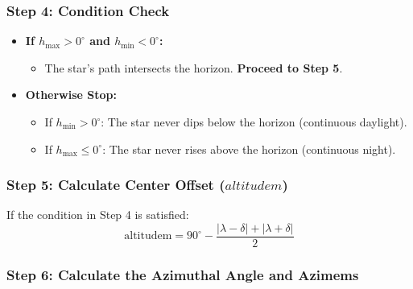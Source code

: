 \documentclass[
  letterpaper,
]{book}
\providecommand{\tightlist}{%
  \setlength{\itemsep}{0pt}\setlength{\parskip}{0pt}}
\begin{document}
\subsubsection{\texorpdfstring{\textbf{Step 4: Condition
Check}}{Step 4: Condition Check}}\label{step-4-condition-check}

\begin{itemize}
\tightlist
\item
  \textbf{If \(h_\text{max} > 0^\circ\) and \(h_\text{min} < 0^\circ\):}

  \begin{itemize}
  \tightlist
  \item
    The star's path intersects the horizon. \textbf{Proceed to Step 5}.
  \end{itemize}
\item
  \textbf{Otherwise Stop:}

  \begin{itemize}
  \tightlist
  \item
    If \(h_\text{min} > 0^\circ\): The star never dips below the horizon
    (continuous daylight).
  \item
    If \(h_\text{max} \leq 0^\circ\): The star never rises above the
    horizon (continuous night).
  \end{itemize}
\end{itemize}

\subsubsection{\texorpdfstring{\textbf{Step 5: Calculate Center Offset
(\(altitudem\))}}{Step 5: Calculate Center Offset (altitudem)}}\label{step-5-calculate-center-offset-altitudem}

If the condition in Step 4 is satisfied: \[
\text{altitudem} = 90^\circ - \frac{|\lambda - \delta| + |\lambda + \delta|}{2}
\]

\subsubsection{\texorpdfstring{\textbf{Step 6: Calculate the Azimuthal
Angle and
Azimems}}{Step 6: Calculate the Azimuthal Angle and Azimems}}\label{step-6-calculate-the-azimuthal-angle-and-azimems}
\end{document}
